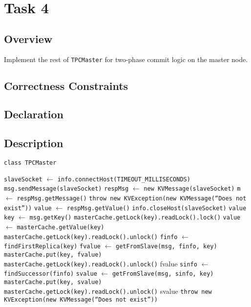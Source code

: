 \documentclass{article}
\begin{document}
\section{Task 4}
\subsection{Overview}
Implement the rest of \texttt{TPCMaster} for two-phase commit logic on the master node.
\subsection{Correctness Constraints}
\subsection{Declaration}
\subsection{Description}
\begin{algorithm}
	\caption{\texttt{class TPCMaster}}
	\begin{algorithmic}
			\State \texttt{slaveSocket} $\leftarrow$ \texttt{info.connectHost(TIMEOUT\_MILLISECONDS)}
			\State \texttt{msg.sendMessage(slaveSocket)}
			\State \texttt{respMsg} $\leftarrow$ \texttt{new KVMessage(slaveSocket)}
			\State \texttt{m} $\leftarrow$ \texttt{respMsg.getMessage()}
				\State \texttt{throw new KVException(new KVMessage(``Does not exist''))}
			\EndIf
			\State \texttt{value} $\leftarrow$ \texttt{respMsg.getValue()}
			\State \texttt{info.closeHost(slaveSocket)}
			\State \Return \texttt{value}
		\EndProcedure
		\State \texttt{key} $\leftarrow$ \texttt{msg.getKey()}
		\State \texttt{masterCache.getLock(key).readLock().lock()}
		\State \texttt{value} $\leftarrow$ \texttt{masterCache.getValue(key)}
			\State \texttt{masterCache.getLock(key).readLock().unlock()}
			\State \Return
		\EndIf
		\State \texttt{finfo} $\leftarrow$ \texttt{findFirstReplica(key)}
		\State \texttt{fvalue} $\leftarrow$ \texttt{getFromSlave(msg, finfo, key)}
			\State \texttt{masterCache.put(key, fvalue)}
			\State \texttt{masterCache.getLock(key).readLock().unlock()}
			\State \Return fvalue
		\EndIf
		\State \texttt{sinfo} $\leftarrow$ \texttt{findSuccessor(finfo)}
		\State \texttt{svalue} $\leftarrow$ \texttt{getFromSlave(msg, sinfo, key)}
			\State \texttt{masterCache.put(key, svalue)}
			\State \texttt{masterCache.getLock(key).readLock().unlock()}
			\State \Return svalue
		\Else
			\State \texttt{throw new KVException(new KVMessage(``Does not exist''))}
		\EndIf
		\EndProcedure
	\end{algorithmic}
\end{algorithm}
\end{document}
